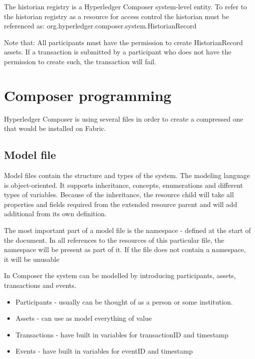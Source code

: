 \documentclass[a4paper,11pt]{report}
\begin{document}
The historian registry is a Hyperledger Composer system-level entity. To refer to the historian registry as a resource for access control the historian must be referenced as: org.hyperledger.composer.system.HistorianRecord

Note that: All participants must have the permission to create HistorianRecord assets. If a transaction is submitted by a participant who does not have the permission to create such, the transaction will fail.

\section{Composer programming}
\label{composerProgramming}

Hyperledger Composer is using several files in order to create a compressed one that would be installed on Fabric.

\subsection{Model file}
\label{modelfile}
Model files contain the structure and types of the system. The modeling language is object-oriented. It supports inheritance, concepts, enumerations and different types of variables. Because of the inheritance, the resource child will take all properties and fields required from the extended resource parent and will add additional from its own definition. 

The most important part of a model file is the namespace - defined at the start of the document. In all references to the resources of this particular file, the namespace will be present as part of it. If the file does not contain a namespace, it will be unusable 

In Composer the system can be modelled by introducing participants, assets, transactions and events. 
\begin{itemize}

\item Participants - usually can be thought of as a person or some institution.
\item Assets - can use as model everything of value
\item Transactions - have built in variables for transactionID and timestamp 
\item Events - have built in variables for eventID and timestamp

\end{itemize}
\end{document}
